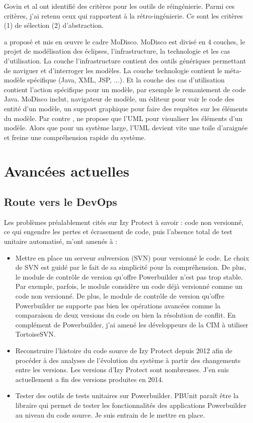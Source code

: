 \documentclass[a4paper]{article}
\begin{document}
Govin et al \cite{Govi18a} ont identifié des critères pour les outils de réingénierie. 
Parmi ces critères, j'ai retenu ceux qui rapportent à la rétro-ingénierie.
Ce sont les critères (1) de sélection (2) d'abstraction. 

\citet{Brun14c} a proposé et mis en œuvre le cadre MoDisco.
MoDisco est divisé en 4 couches, le projet de modélisation des éclipses, l'infrastructure, la technologie et les cas d'utilisation.
La couche l'infrastructure contient des outils génériques permettant de naviguer et d'interroger les modèles.
La couche technologie contient le méta-modèle spécifique (Java, XML, JSP, ...).
Et la couche des cas d'utilisation contient l'action spécifique pour un modèle, par exemple le remaniement de code Java.
MoDisco inclut, navigateur de modèle, un éditeur pour voir le code des entité d'un modèle, un support graphique pour faire des requêtes sur les éléments du modèle. 
Par contre \citet{Brun14c}, ne propose que l'UML pour visualiser les éléments d'un modèle.
Alors que pour un système large, l'UML devient vite une toile d'araignée et freine une compréhension rapide du système.

\section{Avancées actuelles}
\subsection{Route vers le DevOps}
\label{sec: devOps}
Les problèmes préalablement cités sur Izy Protect à savoir : code non versionné, ce qui engendre les pertes et écrasement de code, puis l'absence total de test unitaire automatisé, m'ont amenés à :
\begin{itemize}
\item Mettre en place un serveur subversion (SVN) pour versionné le code. 
Le choix de SVN est guidé par le fait de sa simplicité pour la compréhension. 
De plus, le module de contrôle de version qu'offre Powerbuilder n'est pas trop stable. 
Par exemple, parfois, le module considère un code déjà versionné comme un code non versionné.
De plus, le module de contrôle de version qu'offre Powerbuilder ne supporte pas bien les opérations avancées comme la comparaison de deux versions du code ou bien la résolution de conflit. En complément de Powerbuilder, j'ai amené les développeurs de la CIM à utiliser TortoiseSVN.
\item Reconstruire l'histoire du code source de Izy Protect depuis 2012 afin de procéder à des analyses de l'évolution du système à partir des changements entre les versions. Les versions d'Izy Protect sont nombreuses. J'en suis actuellement a fin des versions produites en 2014.
\item Tester des outils de tests unitaires sur Powerbuilder. PBUnit paraît être la libraire qui permet de tester les fonctionnalités des applications Powerbuilder au niveau du code source. 
Je suis entrain de le mettre en place.
\end{itemize}
\end{document}
